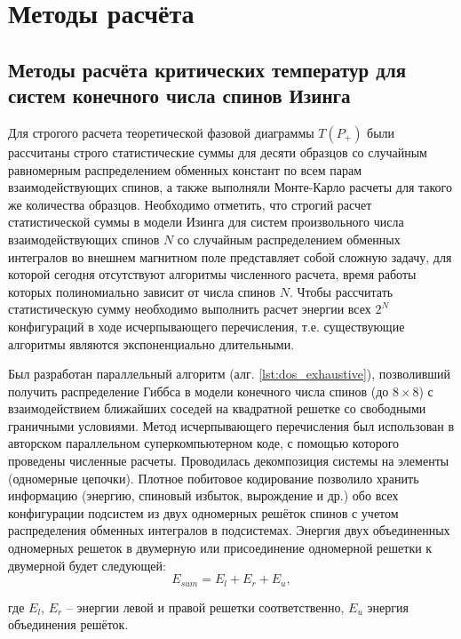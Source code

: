 \chapter{Методы расчёта}\label{ch:ch2}

\section{Методы расчёта критических температур для систем конечного числа спинов Изинга} Для строгого расчета теоретической фазовой диаграммы $T(P_+)$ были рассчитаны строго статистические суммы для десяти образцов со случайным равномерным распределением обменных констант по всем парам взаимодействующих спинов, а также выполняли Монте-Карло расчеты для такого же количества образцов. Необходимо отметить, что строгий расчет статистической суммы в модели Изинга для систем произвольного числа взаимодействующих спинов $N$ со случайным распределением обменных интегралов во внешнем магнитном поле представляет собой сложную задачу, для которой сегодня отсутствуют алгоритмы численного расчета, время работы которых полиномиально зависит от числа спинов $N$. Чтобы рассчитать статистическую сумму необходимо выполнить расчет энергии всех $2^N$ конфигураций в ходе исчерпывающего перечисления, т.е. существующие алгоритмы являются экспоненциально длительными.

Был разработан параллельный алгоритм (алг. \cref{lst:dos_exhaustive}), позволивший получить распределение Гиббса в модели конечного числа спинов (до $8\times8$)  с взаимодействием ближайших соседей на квадратной решетке со свободными граничными условиями. Метод исчерпывающего перечисления был использован в авторском параллельном суперкомпьютерном коде, с помощью которого проведены численные расчеты. Проводилась декомпозиция системы на элементы (одномерные цепочки). Плотное побитовое кодирование позволило хранить информацию (энергию, спиновый избыток, вырождение и др.) обо всех конфигурации подсистем из двух одномерных решёток спинов с учетом распределения обменных интегралов в подсистемах.  Энергия двух объединенных одномерных решеток в двумерную или присоединение одномерной решетки к двумерной будет следующей:
\begin{equation}
	E_{sum}  = E_{l}  + E_{r}  + E_{u},
	\label{eq:unification_energy}
\end{equation}

\noindent где $E_{l}$, $E_{r}$ -- энергии левой и правой решетки соответственно, $E_{u}$ энергия объединения решёток. 


